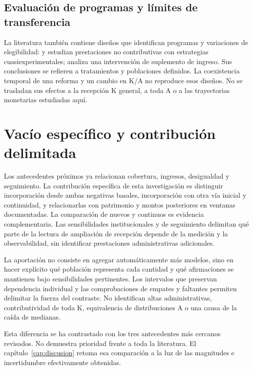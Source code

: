 \subsection{Evaluación de programas y límites de transferencia}

La literatura también contiene diseños que identifican programas y
variaciones de elegibilidad: \citet{galiani2016} y \citet{juarez2015} estudian
prestaciones no contributivas con estrategias cuasiexperimentales; 
\citet{aguila2015} analiza una intervención de suplemento de ingreso.
Sus conclusiones se refieren a tratamientos y poblaciones definidos.
La coexistencia temporal de una reforma y un cambio en K/A no reproduce
esos diseños. No se trasladan sus efectos a la recepción K general, a toda A
o a las trayectorias monetarias estudiadas aquí.

\section{Vacío específico y contribución delimitada}

Los antecedentes próximos ya relacionan cobertura, ingresos, desigualdad y
seguimiento. La contribución específica de esta investigación es distinguir incorporación
desde ambas negativas basales, incorporación con otra vía inicial y continuidad,
y relacionarlas con patrimonio y montos posteriores en ventanas documentadas.
La comparación de nuevos y continuos es evidencia complementaria. Las
sensibilidades institucionales y de seguimiento delimitan qué parte de la
lectura de ampliación de recepción depende de la medición y la observabilidad,
sin identificar prestaciones administrativas adicionales.

La aportación no consiste en agregar automáticamente más modelos, sino en
hacer explícito qué población representa cada cantidad y qué afirmaciones
se mantienen bajo sensibilidades pertinentes. Los intervalos que preservan
dependencia individual y las comprobaciones de empates y faltantes permiten
delimitar la fuerza del contraste. No identifican altas administrativas,
contributividad de toda K, equivalencia de distribuciones A o una causa
de la caída de medianas.

Esta diferencia se ha contrastado con los tres antecedentes más cercanos
revisados. No demuestra prioridad frente a toda la
literatura. El capítulo~\ref{cap:discusion} retoma esa comparación a la luz
de las magnitudes e incertidumbre efectivamente obtenidas.

